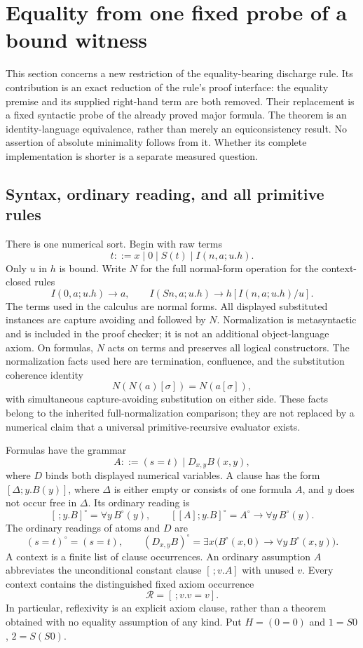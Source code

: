 \section{Equality from one fixed probe of a bound witness}
\label{sec:inferred-discharge}

This section concerns a new restriction of the equality-bearing discharge
rule. Its contribution is an exact reduction of the rule's proof interface:
the equality premise and its supplied right-hand term are both removed.
Their replacement is a fixed syntactic probe of the already proved major
formula. The theorem is an identity-language equivalence, rather than merely
an equiconsistency result. No assertion of absolute minimality follows from
it. Whether its complete implementation is shorter is a separate measured
question.

\subsection{Syntax, ordinary reading, and all primitive rules}

There is one numerical sort. Begin with raw terms
\[
 t::=x\mid0\mid S(t)\mid I(n,a;u.h).
\]
Only $u$ in $h$ is bound. Write $N$ for the full normal-form operation for
the context-closed rules
\[
 I(0,a;u.h)\longrightarrow a,
 \qquad I(Sn,a;u.h)\longrightarrow h[I(n,a;u.h)/u].
\]
The terms used in the calculus are normal forms. All displayed substituted
instances are capture avoiding and followed by $N$. Normalization is
metasyntactic and is included in the proof checker; it is not an additional
object-language axiom. On formulas, $N$ acts on terms and preserves all
logical constructors. The normalization facts used here are termination,
confluence, and the substitution coherence identity
\[
 N(N(a)[\sigma])=N(a[\sigma]),
\]
with simultaneous capture-avoiding substitution on either side. These facts
belong to the inherited full-normalization comparison; they are not replaced
by a numerical claim that a universal primitive-recursive evaluator exists.

Formulas have the grammar
\[
 A::=(s=t)\mid D_{x,y}B(x,y),
\]
where $D$ binds both displayed numerical variables. A clause has the form
$[\Delta;y.B(y)]$, where $\Delta$ is either empty or consists of one
formula $A$, and $y$ does not occur free in $\Delta$. Its ordinary reading is
\[
 [\,;y.B]^\circ=\forall y\,B^\circ(y),\qquad
 [[A];y.B]^\circ=A^\circ\to\forall y\,B^\circ(y).
\]
The ordinary readings of atoms and $D$ are
\[
 (s=t)^\circ=(s=t),\qquad
 (D_{x,y}B)^\circ=\exists x\bigl(B^\circ(x,0)\to
                                  \forall y\,B^\circ(x,y)\bigr).
\]
A context is a finite list of clause occurrences. An ordinary assumption
$A$ abbreviates the unconditional constant clause $[\,;v.A]$ with unused
$v$. Every context contains the distinguished fixed axiom occurrence
\[
 \mathcal R=[\,;v.v=v].
 \tag{Ax}
\]
In particular, reflexivity is an explicit axiom clause, rather than a theorem
obtained with no equality assumption of any kind. Put $H=(0=0)$ and
$1=S0$, $2=S(S0)$.


